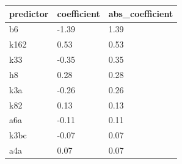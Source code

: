 \begin{tabular}{lll}
\toprule
predictor & coefficient & abs\_coefficient \\
\midrule
b6 & -1.39 & 1.39 \\
k162 & 0.53 & 0.53 \\
k33 & -0.35 & 0.35 \\
h8 & 0.28 & 0.28 \\
k3a & -0.26 & 0.26 \\
k82 & 0.13 & 0.13 \\
a6a & -0.11 & 0.11 \\
k3bc & -0.07 & 0.07 \\
a4a & 0.07 & 0.07 \\
\bottomrule
\end{tabular}
